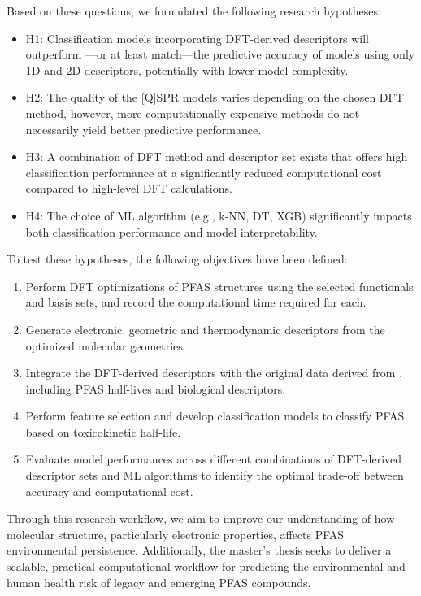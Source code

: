 Based on these questions, we formulated the following research hypotheses:

\begin{itemize}
  \item H1: Classification models incorporating DFT-derived descriptors will outperform —or at least match—the predictive accuracy of models using only 1D and 2D descriptors, potentially with lower model complexity.
  
  \item H2: The quality of the [Q]SPR models varies depending on the chosen DFT method, however, more computationally expensive methods do not necessarily yield better predictive performance.
  
  \item H3: A combination of DFT method and descriptor set exists that offers high classification performance at a significantly reduced computational cost compared to high-level DFT calculations.
  
  \item H4: The choice of ML algorithm (e.g., k-NN, DT, XGB) significantly impacts both classification performance and model interpretability.
\end{itemize}

To test these hypotheses, the following objectives have been defined:

\begin{enumerate}
  \item Perform DFT optimizations of PFAS structures using the selected functionals and basis sets, and record the computational time required for each.
  
  \item Generate electronic, geometric and thermodynamic descriptors from the optimized molecular geometries.
  
  \item Integrate the DFT-derived descriptors with the original data derived from \cite{dataset_source} , including PFAS half-lives and biological descriptors.
  
  \item Perform feature selection and develop classification models to classify PFAS based on toxicokinetic half-life.
  
  \item Evaluate model performances across different combinations of DFT-derived descriptor sets and ML algorithms to identify the optimal trade-off between accuracy and computational cost.
\end{enumerate}

Through this research workflow, we aim to improve our understanding of how molecular structure, particularly electronic properties, affects PFAS environmental persistence. Additionally, the master’s thesis seeks to deliver a scalable, practical computational workflow for predicting the environmental and human health risk of legacy and emerging PFAS compounds.

